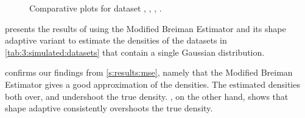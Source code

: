 
\begin{figure}
	\centering
	
	\caption{Comparative plots for dataset \ferdosiOne, \baakmanOne, \baakmanFour, \baakmanFive.}
	\label{fig:4:results:singleSphere}
\end{figure}

	 presents the results of using the Modified Breiman Estimator and its shape adaptive variant to estimate the densities of the datasets in \cref{tab:3:simulated:datasets} that contain a single Gaussian distribution. 

	 confirms our findings from \cref{s:results:mse}, namely that the Modified Breiman Estimator gives a good approximation of the densities. The estimated densities both over, and undershoot the true density. , on the other hand, shows that shape adaptive \mbe consistently overshoots the true density. 

